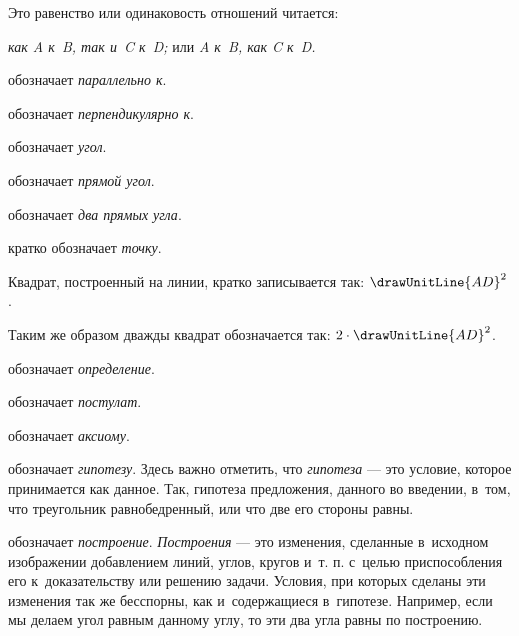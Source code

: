 \documentclass[letters,booklanguage=russian]{byrnebook}
\begin{document}
Это равенство или одинаковость отношений читается:

\emph{как A к~B, так и~C к~D;} или \emph{A к~B, как C к~D.}

\symb{$\parallel$}
 обозначает \emph{параллельно к}.

\symb{$\perp$}
 обозначает \emph{перпендикулярно к}.


 обозначает \emph{угол}.

 обозначает \emph{прямой угол}.

\symb{\drawTwoRightAngles}
 обозначает \emph{два прямых угла}.


кратко обозначает \emph{точку}.

Квадрат, построенный на линии, кратко записывается так: $\drawUnitLine{AD}^2$.

Таким же образом дважды квадрат обозначается так: $2 \cdot \drawUnitLine{AD}^2$.

\symb{\indefstr}
 обозначает \emph{определение}.

\symb{\inpoststr}
 обозначает \emph{постулат}.

\symb{\inaxstr}
 обозначает \emph{аксиому}.

\symb{\hypstr}
 обозначает \emph{гипотезу}. Здесь важно отметить, что \emph{гипотеза} — это условие, которое принимается как данное. Так, гипотеза предложения, данного во введении, в~том, что треугольник равнобедренный, или что две его стороны равны.

\symb{\conststr}
 обозначает \emph{построение}.  \emph{Построения} — это изменения, сделанные в~исходном изображении добавлением линий, углов, кругов и~т. п. с~целью приспособления его к~доказательству или решению задачи. Условия, при которых сделаны эти изменения так же бесспорны, как и~содержащиеся в~гипотезе. Например, если мы делаем угол равным данному углу, то эти два угла равны по построению.
\end{document}
